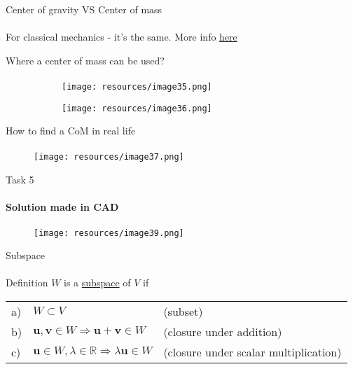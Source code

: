 \documentclass[aspectratio=169,notes]{beamer}
\begin{document}
\begin{frame}[t]{Center of gravity VS Center of mass}
    \framesubtitle{}
    For classical mechanics - it’s the same. More info \href{https://www.youtube.com/watch?v=abUFbZfPzjY}{here}
\end{frame}

\begin{frame}[t]{Where a center of mass can be used?}
    \framesubtitle{}
    \begin{figure}[H]
        \begin{subfigure}{0.49\textwidth}
            \centering\texttt{[image: resources/image35.png]}
            \label{fig:resources/image35.png}
        \end{subfigure}
        \begin{subfigure}{0.49\textwidth}
            \centering\texttt{[image: resources/image36.png]}
            \label{fig:resources/image36.png}
        \end{subfigure}
    \end{figure}
\end{frame}

\begin{frame}[t]{How to find a CoM in real life}
    \framesubtitle{}
    \vspace{-0.3cm}
    \begin{figure}[H]
        \centering\texttt{[image: resources/image37.png]}
        \label{fig:resources/image37.png}
    \end{figure}
\end{frame}

\begin{frame}[t]{Task 5}
    \framesubtitle{Solution made in CAD}
    \vspace{-0.6cm}
    \begin{figure}[H]
        \centering\texttt{[image: resources/image39.png]}
        \label{fig:resources/image39.png}
    \end{figure}
\end{frame}

\begin{frame}[t]{Subspace}
    \framesubtitle{}
    \begin{exampleblock}{Definition}
        $W$ is a \underline{subspace} of $V$ if

        \begin{tabular}{lll}
            a) & $W \subset V$                                                                 & (subset)                 \\
            b) & $\mathbf{u},\mathbf{v}\in W \Rightarrow \mathbf{u}+\mathbf{v} \in W$          & (closure under addition) \\
            c) & $\mathbf{u}\in W, \lambda \in \mathbb{R} \Rightarrow \lambda \mathbf{u}\in W$ &
            (closure under scalar multiplication)
        \end{tabular}
    \end{exampleblock}
\end{frame}
\end{document}
